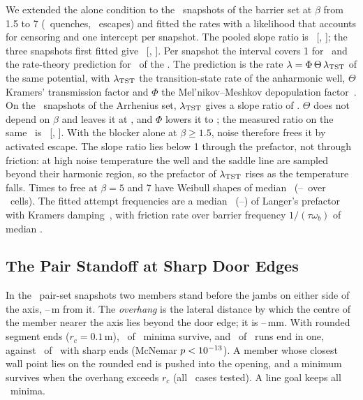 We extended the alone condition to the \RzTtwoN\ snapshots of the barrier set at $\beta$ from 1.5 to 7 (\RzTtwoRestarts\ quenches, \RzTtwoEvents\ escapes) and fitted the rates with a likelihood that accounts for censoring and one intercept per snapshot. The pooled slope ratio is \RzTtwoRatio\ [\RzTtwoLo, \RzTtwoHi]; the three snapshots first fitted give \RvAthreeSlopeRatio\ [\RvAthreeSlopeRatioLo, \RvAthreeSlopeRatioHi]. Per snapshot the interval covers 1 for \RzTtwoCoverone\ and the rate-theory prediction for \RzTtwoCoverTheory\ of the \RzTtwoN. The prediction is the rate $\lambda=\Phi\,\Theta\,\lambda_{\rm TST}$ of the same potential, with $\lambda_{\rm TST}$ the transition-state rate of the anharmonic well, $\Theta$ Kramers' transmission factor and $\Phi$ the Mel'nikov--Meshkov depopulation factor~\cite{melnikov1986}. On the \EfourN\ snapshots of the Arrhenius set, $\lambda_{\rm TST}$ gives a slope ratio of \RzTthreeTst. $\Theta$ does not depend on $\beta$ and leaves it at \RzTthreeTheta, and $\Phi$ lowers it to \RzTthreeFull; the measured ratio on the same \EfourN\ is \RzTtwoEfourRatio\ [\RzTtwoEfourLo, \RzTtwoEfourHi]. With the blocker alone at $\beta\ge1.5$, noise therefore frees it by activated escape. The slope ratio lies below 1 through the prefactor, not through friction: at high noise temperature the well and the saddle line are sampled beyond their harmonic region, so the prefactor of $\lambda_{\rm TST}$ rises as the temperature falls. Times to free at $\beta=5$ and 7 have Weibull shapes of median \RzTtwoWeibullMed\ (\RzTtwoWeibullMin--\RzTtwoWeibullMax\ over \RzTtwoWeibullCells\ cells). The fitted attempt frequencies are a median \RzTtwoNuLangerMed\ (\RzTtwoNuLangerMin--\RzTtwoNuLangerMax) of Langer's prefactor with Kramers damping~\cite{langer1969}, with friction rate over barrier frequency $1/(\tau\omega_b)$ of median \RzTtwoGammaOmegaMed.

\subsection{The Pair Standoff at Sharp Door Edges}\label{sec:pair}
In the \PairN\ pair-set snapshots two members stand before the jambs on either side of the axis, \PairAxisMin--\PairAxisMax\,m from it. The \emph{overhang} is the lateral distance by which the centre of the member nearer the axis lies beyond the door edge; it is \RevBfiveOverhangMin--\RevBfiveOverhangMax\,mm. With rounded segment ends ($r_c=0.1$\,m), \RevBfiveKept\ of \RevBfiveN\ minima survive, and \RevBfiveGenPair\ of \RevBfiveGenN\ runs end in one, against \RevBfiveGenPairRef\ of \RevBfiveGenN\ with sharp ends (McNemar $p<10^{-13}$). A member whose closest wall point lies on the rounded end is pushed into the opening, and a minimum survives when the overhang exceeds $r_c$ (all \RevBfiveRuleN\ cases tested). A line goal keeps all \RevBsixKept\ minima.

